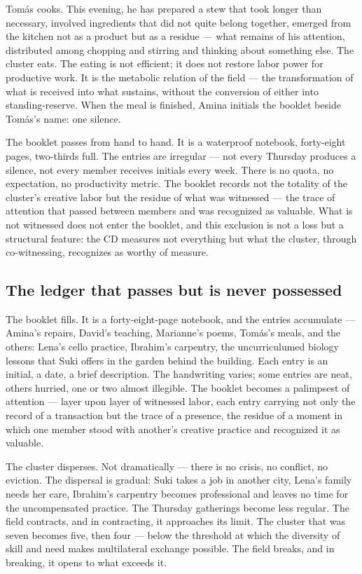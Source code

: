 Tomás cooks. This evening, he has prepared a stew that took longer than necessary, involved ingredients that did not quite belong together, emerged from the kitchen not as a product but as a residue — what remains of his attention, distributed among chopping and stirring and thinking about something else. The cluster eats. The eating is not efficient; it does not restore labor power for productive work. It is the metabolic relation of the field — the transformation of what is received into what sustains, without the conversion of either into standing-reserve. When the meal is finished, Amina initials the booklet beside Tomás's name: one silence.

The booklet passes from hand to hand. It is a waterproof notebook, forty-eight pages, two-thirds full. The entries are irregular — not every Thursday produces a silence, not every member receives initials every week. There is no quota, no expectation, no productivity metric. The booklet records not the totality of the cluster's creative labor but the residue of what was witnessed — the trace of attention that passed between members and was recognized as valuable. What is not witnessed does not enter the booklet, and this exclusion is not a loss but a structural feature: the CD measures not everything but what the cluster, through co-witnessing, recognizes as worthy of measure.

\subsection{The ledger that passes but is never possessed}

The booklet fills. It is a forty-eight-page notebook, and the entries accumulate — Amina's repairs, David's teaching, Marianne's poems, Tomás's meals, and the others: Lena's cello practice, Ibrahim's carpentry, the uncurriculumed biology lessons that Suki offers in the garden behind the building. Each entry is an initial, a date, a brief description. The handwriting varies; some entries are neat, others hurried, one or two almost illegible. The booklet becomes a palimpsest of attention — layer upon layer of witnessed labor, each entry carrying not only the record of a transaction but the trace of a presence, the residue of a moment in which one member stood with another's creative practice and recognized it as valuable.

The cluster disperses. Not dramatically — there is no crisis, no conflict, no eviction. The dispersal is gradual: Suki takes a job in another city, Lena's family needs her care, Ibrahim's carpentry becomes professional and leaves no time for the uncompensated practice. The Thursday gatherings become less regular. The field contracts, and in contracting, it approaches its limit. The cluster that was seven becomes five, then four — below the threshold at which the diversity of skill and need makes multilateral exchange possible. The field breaks, and in breaking, it opens to what exceeds it.

